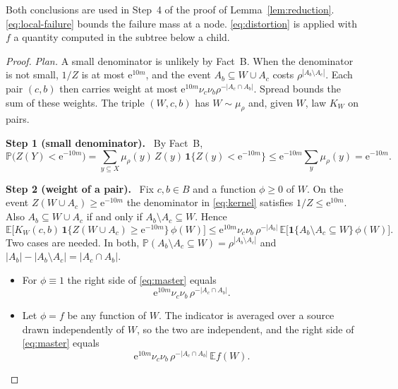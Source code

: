 \documentclass[11pt]{article}
\numberwithin{equation}{section}
\newcommand{\PP}{\mathbb P}
\newcommand{\EE}{\mathbb E}
\newcommand{\ind}{\mathbf 1}
\newcommand{\ee}{\mathrm e}
\newcommand{\step}[2]{\medskip\noindent\textbf{Step #1 (#2).}\ }
\begin{document}
Both conclusions are used in Step~4 of the proof of
Lemma~\ref{lem:reduction}. \eqref{eq:local-failure} bounds the failure
mass at a node. \eqref{eq:distortion} is applied with $f$ a quantity
computed in the subtree below a child.

\begin{proof}
\emph{Plan.} A small denominator is unlikely by Fact~B. When the
denominator is not small, $1/Z$ is at most $\ee^{10m}$, and the event
$A_b\subseteq W\cup A_c$ costs $\rho^{|A_b\setminus A_c|}$. Each pair
$(c,b)$ then carries weight at most
$\ee^{10m}\nu_c\nu_b\rho^{-|A_c\cap A_b|}$. Spread bounds the sum of
these weights. The triple $(W,c,b)$ has $W\sim\mu_\rho$ and, given
$W$, law $K_W$ on pairs.

\step{1}{small denominator}
By Fact~B,
\begin{equation}\label{eq:small-denominator}
 \PP\bigl(Z(Y)<\ee^{-10m}\bigr)
 =\sum_{y\subseteq X}\mu_\rho(y)\,Z(y)\,\ind\{Z(y)<\ee^{-10m}\}
 \le\ee^{-10m}\sum_{y}\mu_\rho(y)=\ee^{-10m}.
\end{equation}

\step{2}{weight of a pair}
Fix $c,b\in B$ and a function $\phi\ge0$ of $W$. On the event
$Z(W\cup A_c)\ge\ee^{-10m}$ the denominator in \eqref{eq:kernel}
satisfies $1/Z\le\ee^{10m}$. Also $A_b\subseteq W\cup A_c$ if and only
if $A_b\setminus A_c\subseteq W$. Hence
\begin{equation}\label{eq:master}
 \EE\bigl[K_W(c,b)\,\ind\{Z(W\cup A_c)\ge\ee^{-10m}\}\,\phi(W)\bigr]
 \le\ee^{10m}\nu_c\nu_b\,\rho^{-|A_b|}\,
 \EE\bigl[\ind\{A_b\setminus A_c\subseteq W\}\,\phi(W)\bigr].
\end{equation}
Two cases are needed. In both,
$\PP(A_b\setminus A_c\subseteq W)=\rho^{|A_b\setminus A_c|}$ and
$|A_b|-|A_b\setminus A_c|=|A_c\cap A_b|$.
\begin{itemize}[leftmargin=1.6em,itemsep=2pt]
 \item For $\phi\equiv1$ the right side of \eqref{eq:master} equals
 \begin{equation}\label{eq:master-one}
  \ee^{10m}\nu_c\nu_b\,\rho^{-|A_c\cap A_b|}.
 \end{equation}
 \item Let $\phi=f$ be any function of $W$. The
 indicator is averaged over a source drawn independently of $W$, so the two are
 independent, and the right side of \eqref{eq:master} equals
 \begin{equation}\label{eq:master-f}
  \ee^{10m}\nu_c\nu_b\,\rho^{-|A_c\cap A_b|}\,\EE f(W).
 \end{equation}
\end{itemize}


\end{proof}
\end{document}
